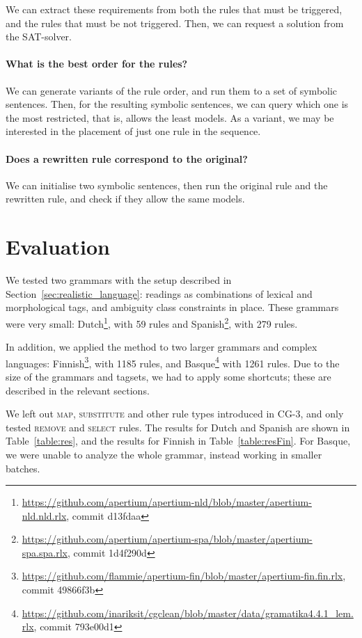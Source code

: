 {{We can extract these requirements from both the rules that must be triggered, and the rules that must be not triggered. Then, we can request a solution from the SAT-solver.

\paragraph{What is the best order for the rules?}
We can generate variants of the rule order, and run them to a set of symbolic sentences. Then, for the resulting symbolic sentences, we can query which one is the most restricted, that is, allows the least models.
As a variant, we may be interested in the placement of just one rule in the sequence.

\paragraph{Does a rewritten rule correspond to the original?}
We can initialise two symbolic sentences, then run the original rule and the rewritten rule, and check if they allow the same models. 




\section{Evaluation}
\label{sec:eval}

We tested two grammars with the setup described in
Section~\ref{sec:realistic_language}: readings as combinations of
lexical and morphological tags, and ambiguity class constraints in place.
These grammars were very small:
Dutch\footnote{\scriptsize{\url{https://github.com/apertium/apertium-nld/blob/master/apertium-nld.nld.rlx}, commit d13fdaa}},
with 59 rules and 
Spanish\footnote{\scriptsize{\url{https://github.com/apertium/apertium-spa/blob/master/apertium-spa.spa.rlx}, commit 1d4f290d}},
with 279 rules.

In addition, we applied the method to two larger grammars and complex languages:
Finnish\footnote{\scriptsize{\url{https://github.com/flammie/apertium-fin/blob/master/apertium-fin.fin.rlx}, commit 49866f3b}},
with 1185 rules, and
Basque\footnote{\scriptsize{\url{https://github.com/inariksit/cgclean/blob/master/data/gramatika4.4.1_lem.rlx}, commit 793e00d1}}
with 1261 rules. Due to the size of the grammars and tagsets, we had
to apply some shortcuts; these are described in the relevant sections.

We left out \textsc{map}, \textsc{substitute} and other rule
types introduced in CG-3, and only tested \textsc{remove} and \textsc{select} rules.
The results for Dutch and Spanish are shown in Table~\ref{table:res},
and the results for Finnish in Table~\ref{table:resFin}. For Basque,
we were unable to analyze the whole grammar, instead working in
smaller batches. 


}}
